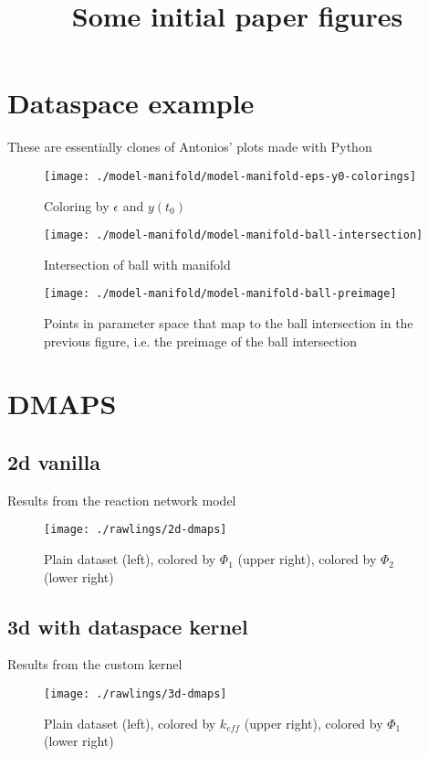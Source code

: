 \documentclass[11pt]{article}
\title{Some initial paper figures}
\author{}
\begin{document}
\maketitle

\section{Dataspace example}

These are essentially clones of Antonios' plots made with Python

\begin{figure}[htbp]
  \centering
  \texttt{[image: ./model-manifold/model-manifold-eps-y0-colorings]}
  \caption{Coloring by $\epsilon$ and $y(t_0)$}
\end{figure}

\begin{figure}[htbp]
  \centering
  \texttt{[image: ./model-manifold/model-manifold-ball-intersection]}
  \caption{Intersection of ball with manifold}
\end{figure}

\begin{figure}[htbp]
  \centering
  \texttt{[image: ./model-manifold/model-manifold-ball-preimage]}
  \caption{Points in parameter space that map to the ball intersection
  in the previous figure, i.e. the preimage of the ball intersection}
\end{figure}

\clearpage

\section{DMAPS}

\subsection{2d vanilla}

Results from the reaction network model

\begin{figure}[htbp]
  \centering
  \texttt{[image: ./rawlings/2d-dmaps]}
  \caption{Plain dataset (left), colored by $\Phi_1$ (upper right), colored by $\Phi_2$ (lower right)}
\end{figure}

\clearpage

\subsection{3d with dataspace kernel}

Results from the custom kernel

\begin{figure}[htbp]
  \centering
  \texttt{[image: ./rawlings/3d-dmaps]}
  \caption{Plain dataset (left), colored by $k_{eff}$ (upper right), colored by $\Phi_1$ (lower right)}
\end{figure}


% 
% 
\end{document}
